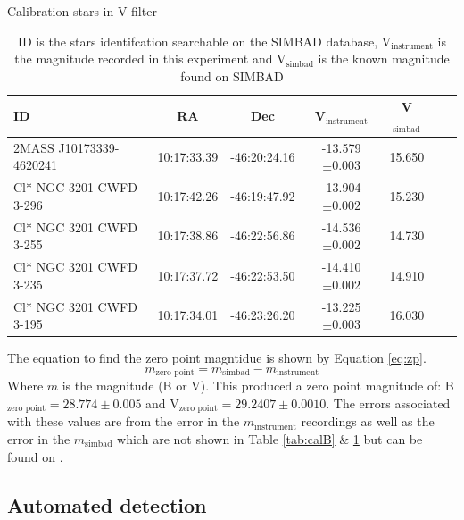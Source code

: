 \documentclass[11pt]{article}
\begin{document}
\begin{table}[h]
\centering
\caption{Calibration stars in V filter}
\begin{tabular}{lcccccc}
\toprule
ID & RA & Dec & V$_{\text{instrument}}$ & V$_{\text{simbad}}$\\
\midrule
2MASS J10173339-4620241 & 10:17:33.39 & -46:20:24.16 & -13.579$\pm 0.003$ & 15.650 \\                   
Cl* NGC 3201 CWFD 3-296 & 10:17:42.26 & -46:19:47.92 & -13.904$\pm 0.002$ & 15.230 \\                  
Cl* NGC 3201 CWFD 3-255 & 10:17:38.86 & -46:22:56.86 & -14.536$\pm 0.002$ & 14.730 \\                  
Cl* NGC 3201 CWFD 3-235 & 10:17:37.72 & -46:22:53.50 & -14.410$\pm 0.002$ & 14.910 \\                     
Cl* NGC 3201 CWFD 3-195 & 10:17:34.01 & -46:23:26.20 & -13.225$\pm 0.003$ & 16.030\\ 
\bottomrule
\end{tabular}
\caption*{ID is the stars identifcation searchable on the SIMBAD database, V$_{\text{instrument}}$ is the magnitude recorded in this experiment and V$_{\text{simbad}}$ is the known magnitude found on SIMBAD \citep{simbad}}
\label{tab:calV}
\end{table}

The equation to find the zero point magntidue is shown by Equation \ref{eq:zp}.
\begin{equation}
	m_{\text{zero point}} = m_{\text{simbad}} - m_{\text{instrument}}
	\label{eq:zp}
\end{equation}
Where $m$ is the magnitude (B or V). This produced a zero point magnitude of: B$_{\text{zero point}} = 28.774 \pm 0.005$ and V$_{\text{zero point}} = 29.2407 \pm 0.0010$. The errors associated with these values are from the error in the $m_{\text{instrument}}$ recordings as well as the error in the $m_{\text{simbad}}$ which are not shown in Table \ref{tab:calB} \& \ref{tab:calV} but can be found on \citet{simbad}. 

\subsection{Automated detection}
\end{document}
